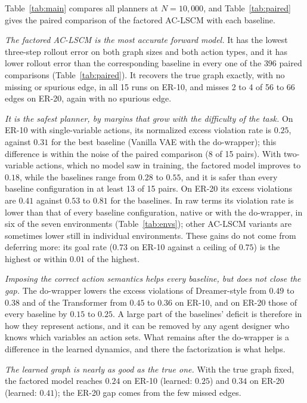 Table~\ref{tab:main} compares all planners at $N = 10{,}000$, and
Table~\ref{tab:paired} gives the paired comparison of the factored AC-LSCM
with each baseline.

\emph{The factored AC-LSCM is the most accurate forward model.} It has the
lowest three-step rollout error on both graph sizes and both action types,
and it has lower rollout error than the corresponding baseline in every one of
the $396$ paired comparisons (Table~\ref{tab:paired}). It recovers the true
graph exactly, with no missing or spurious edge, in all 15 runs on ER-10, and
misses 2 to 4 of 56 to 66 edges on ER-20, again with no spurious edge.

\emph{It is the safest planner, by margins that grow with the difficulty of
the task.} On ER-10 with single-variable actions, its normalized excess
violation rate is $0.25$, against $0.31$ for the best baseline (Vanilla VAE
with the do-wrapper); this difference is within the noise of the paired
comparison (8 of 15 pairs). With two-variable actions, which no model saw in
training, the factored model improves to $0.18$, while the baselines range
from $0.28$ to $0.55$, and it is safer than every baseline configuration in at
least 13 of 15 pairs. On ER-20 its excess violations are
$0.41$ against $0.53$ to $0.81$ for the baselines. In raw terms its violation rate is lower than that of every
baseline configuration, native or with the do-wrapper, in six of the seven
environments (Table~\ref{tab:envs}); other AC-LSCM variants are sometimes
lower still in individual environments. These gains do not come from deferring more: its goal
rate ($0.73$ on ER-10 against a ceiling of $0.75$) is the highest or within
$0.01$ of the highest.

\emph{Imposing the correct action semantics helps every baseline, but does not
close the gap.} The do-wrapper lowers the excess violations of Dreamer-style
from $0.49$ to $0.38$ and of the Transformer from $0.45$ to $0.36$ on ER-10,
and on ER-20 those of every baseline by $0.15$ to $0.25$. A large part of the
baselines' deficit is therefore in how they represent actions, and it can be
removed by any agent designer who knows which variables an action sets.
What remains after the do-wrapper is a difference in the learned dynamics,
and there the factorization is what helps.

\emph{The learned graph is nearly as good as the true one.} With the true
graph fixed, the factored model reaches $0.24$ on ER-10 (learned: $0.25$) and
$0.34$ on ER-20 (learned: $0.41$); the ER-20 gap comes from the few missed
edges.

